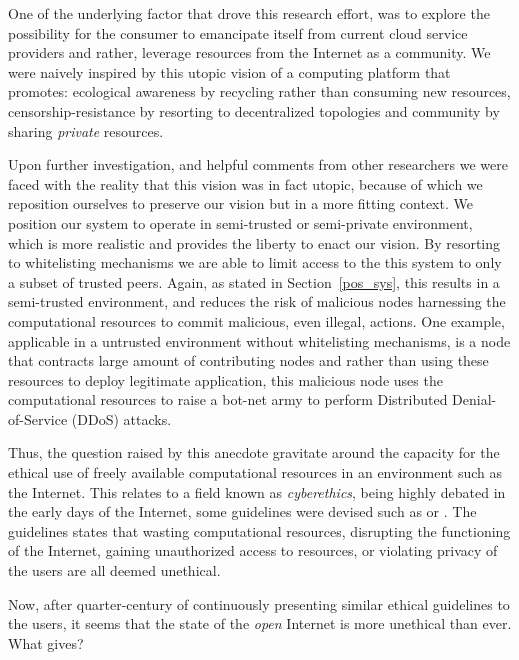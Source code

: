 \documentclass[12pt, titlepage]{uo_temp}
\begin{document}
     One of the underlying factor that drove this research effort, was to explore the
     possibility for the consumer to emancipate itself from current cloud service
     providers and rather, leverage resources from the Internet as a community.
     We were naively inspired by this utopic vision of a computing platform that promotes:
     ecological awareness by recycling rather than consuming new resources,
     censorship-resistance by resorting to decentralized topologies and community by
     sharing \emph{private} resources.

     Upon further investigation, and helpful comments from other researchers we were faced
     with the reality that this vision was in fact utopic, because of which we reposition
     ourselves to preserve our vision but in a more fitting context. We position
     our system to operate in semi-trusted or semi-private environment, which is more
     realistic and provides the liberty to enact our vision. By resorting to whitelisting
     mechanisms we are able to limit access to the this system to only a subset of trusted
     peers. Again, as stated in Section~\ref{pos_sys}, this results in a semi-trusted
     environment, and reduces the risk of malicious nodes harnessing the computational
     resources to commit malicious, even illegal, actions. One example, applicable in a
     untrusted environment without whitelisting mechanisms, is a node that contracts large
     amount of contributing nodes and rather than using these resources to deploy
     legitimate application, this malicious node uses the computational resources to raise
     a bot-net army to perform Distributed Denial-of-Service (DDoS) attacks. 

     Thus, the question raised by this anecdote gravitate around the capacity for the
     ethical use of freely available computational resources in an environment such as the
     Internet. This relates to a field known as \emph{cyberethics}, being highly
     debated in the early days of the Internet, some guidelines were devised such as
     \cite{ethics1989rfc} or \cite{barquin1992pursuit}. The guidelines states that wasting
     computational resources, disrupting the functioning of the Internet, gaining
     unauthorized access to resources, or violating privacy of the users are all deemed
     unethical.

     Now, after quarter-century of continuously presenting similar ethical guidelines to the
     users, it seems that the state of the \emph{open} Internet is more unethical than
     ever. What gives?
\end{document}

